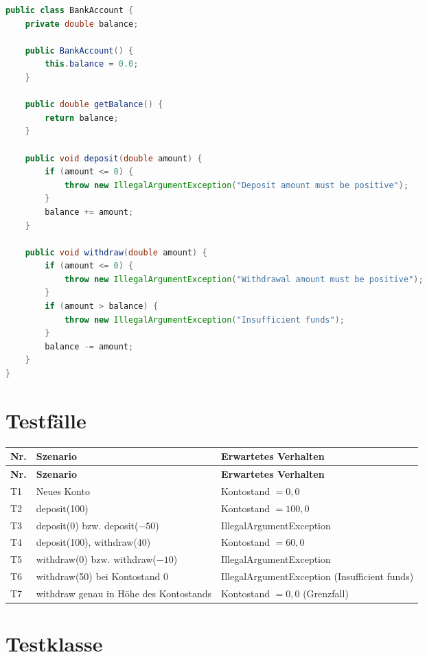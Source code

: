 \documentclass[
	fontsize=12pt,          %
	paper=a4,               %
	numbers=noenddot,       %
	listof=totoc,           %
	listof=entryprefix,     %
	listof=nochaptergap,    %
	bibliography=totoc,     %
	parskip=half,           %
	openany                 %
]{scrbook}
\begin{document}
\begin{lstlisting}[language=Java]
public class BankAccount {
    private double balance;

    public BankAccount() {
        this.balance = 0.0;
    }

    public double getBalance() {
        return balance;
    }

    public void deposit(double amount) {
        if (amount <= 0) {
            throw new IllegalArgumentException("Deposit amount must be positive");
        }
        balance += amount;
    }

    public void withdraw(double amount) {
        if (amount <= 0) {
            throw new IllegalArgumentException("Withdrawal amount must be positive");
        }
        if (amount > balance) {
            throw new IllegalArgumentException("Insufficient funds");
        }
        balance -= amount;
    }
}
\end{lstlisting}

\section*{Testfälle}

\begin{longtable}{| p{1.0cm} | p{5.0cm} | p{6.0cm} |}
	\hline
	\textbf{Nr.} & \textbf{Szenario} & \textbf{Erwartetes Verhalten} \\ \hline
	\endfirsthead
	\hline
	\textbf{Nr.} & \textbf{Szenario} & \textbf{Erwartetes Verhalten} \\ \hline
	\endhead
	\hline
	\endfoot
	T1 & Neues Konto & Kontostand $= 0{,}0$ \\ \hline
	T2 & deposit(100) & Kontostand $= 100{,}0$ \\ \hline
	T3 & deposit(0) bzw. deposit($-50$) & IllegalArgumentException \\ \hline
	T4 & deposit(100), withdraw(40) & Kontostand $= 60{,}0$ \\ \hline
	T5 & withdraw(0) bzw. withdraw($-10$) & IllegalArgumentException \\ \hline
	T6 & withdraw(50) bei Kontostand 0 & IllegalArgumentException (Insufficient funds) \\ \hline
	T7 & withdraw genau in Höhe des Kontostands & Kontostand $= 0{,}0$ (Grenzfall) \\ \hline
\end{longtable}

\section*{Testklasse}
\end{document}
